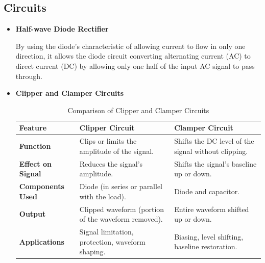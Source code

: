     \subsection{Circuits}
        \begin{itemize}
            \item \textbf{Half-wave Diode Rectifier}\par
            By using the diode's characteristic of allowing current to flow in only one direction, it allows the diode circuit converting alternating current (AC) to direct current (DC) by allowing only one half of the input AC signal to pass through.
            
            \item \textbf{Clipper and Clamper Circuits}\par
            \begin{table}[h]
            \centering
            \begin{tabular}{|p{3cm}|p{4cm}|p{4cm}|}
                \hline
                \textbf{Feature} & \textbf{Clipper Circuit} & \textbf{Clamper Circuit} \\
                \hline
                \textbf{Function} & Clips or limits the amplitude of the signal. & Shifts the DC level of the signal without clipping. \\
                \hline
                \textbf{Effect on Signal} & Reduces the signal's amplitude. & Shifts the signal's baseline up or down. \\
                \hline
                \textbf{Components Used} & Diode (in series or parallel with the load). & Diode and capacitor. \\
                \hline
                \textbf{Output} & Clipped waveform (portion of the waveform removed). & Entire waveform shifted up or down. \\
                \hline
                \textbf{Applications} & Signal limitation, protection, waveform shaping. & Biasing, level shifting, baseline restoration. \\
                \hline
                \end{tabular}
            \caption{Comparison of Clipper and Clamper Circuits}
            \end{table}
            \FloatBarrier
            
        \end{itemize}
